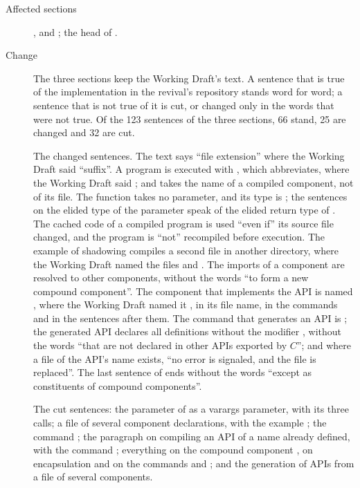 \begin{description}
\item[Affected sections] ,  and
; the head of .
\item[Change] The three sections keep the Working Draft's text.
A sentence that is true of the implementation in the revival's repository
stands word for word; a sentence that is not true of it is cut, or changed
only in the words that were not true.
Of the 123 sentences of the three sections, 66 stand, 25 are changed and 32
are cut.

The changed sentences.
The text says ``file extension'' where the Working Draft said ``suffix''.
A program is executed with , which 
abbreviates, where the Working Draft said ; and
 takes the name of a compiled component, not of its file.
The function  takes no parameter, and its type is
\EXP{() \rightarrow ()}; the sentences on the elided type of the parameter
 speak of the elided return type of .
The cached code of a compiled program is used ``even if'' its source file
changed, and the program is ``not'' recompiled before execution.
The example of shadowing compiles a second file  in
another directory, where the Working Draft named the files
 and .
The imports of a component are resolved to other components, without the
words ``to form a new compound component''.
The component that implements the API  is named ,
where the Working Draft named it , in its file name, in the
commands and in the sentences after them.
The command that generates an API is ; the generated API declares all definitions without the modifier
, without the words ``that are not declared in other APIs
exported by $C$''; and where a file of the API's name exists, ``no error is
signaled, and the file is replaced''.
The last sentence of  ends without the words ``except as
constituents of compound components''.

The cut sentences: the parameter of  as a varargs parameter, with its
three calls; a file of several component declarations, with the example
; the command ; the paragraph on
compiling an API of a name already defined, with the command
; everything on the compound component , on
encapsulation and on the commands  and
; and the generation of APIs from a file of several
components.


\end{description}
